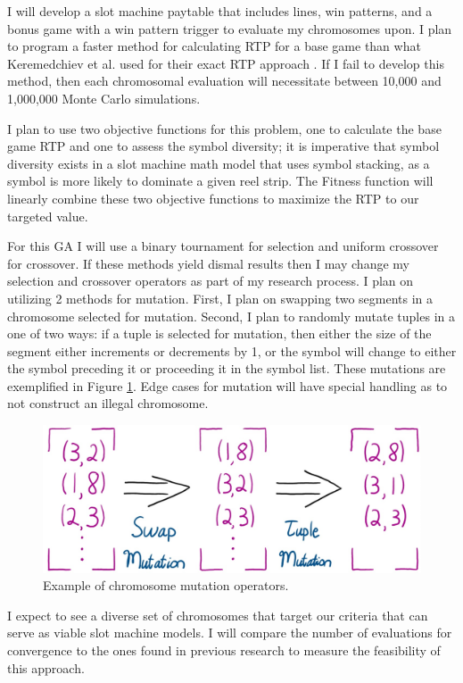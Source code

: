 \documentclass[11pt]{article} %
\begin{document}
I will develop a slot machine paytable that includes lines, win patterns, and a bonus game with a win pattern trigger to evaluate my chromosomes upon.
I plan to program a faster method for calculating RTP for a base game than what Keremedchiev et al. used for their exact RTP approach \cite{keremedchiev2017slot}.
If I fail to develop this method, then each chromosomal evaluation will necessitate between 10,000 and 1,000,000 Monte Carlo simulations.
\par
I plan to use two objective functions for this problem, one to calculate the base game RTP and one to assess the symbol diversity; it is imperative that symbol diversity exists in a slot machine math model that uses symbol stacking, as a symbol is more likely to dominate a given reel strip.
The Fitness function will linearly combine these two objective functions to maximize the RTP to our targeted value.
\par
For this GA I will use a binary tournament for selection and uniform crossover for crossover.
If these methods yield dismal results then I may change my selection and crossover operators as part of my research process.
I plan on utilizing 2 methods for mutation.
First, I plan on swapping two segments in a chromosome selected for mutation.
Second, I plan to randomly mutate tuples in a one of two ways: if a tuple is selected for mutation, then either the size of the segment either increments or decrements by 1, or the symbol will change to either the symbol preceding it or proceeding it in the symbol list.
These mutations are exemplified in Figure \ref{mutation}.
Edge cases for mutation will have special handling as to not construct an illegal chromosome.
\begin{figure}[H]
\centering
\includegraphics[scale=0.25]{Mutation_Operators}
\caption{Example of chromosome mutation operators.}
\label{mutation}
\end{figure}
\par
I expect to see a diverse set of chromosomes that target our criteria that can serve as viable slot machine models.
I will compare the number of evaluations for convergence to the ones found in previous research to measure the feasibility of this approach.
\end{document}
